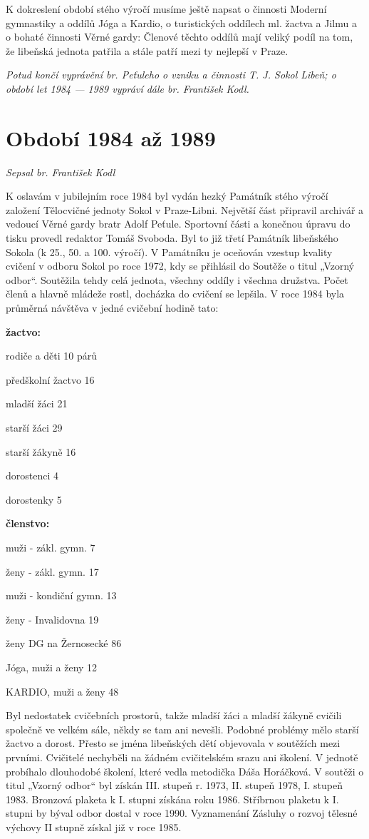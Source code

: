 K dokreslení období stého výročí musíme ještě napsat o činnosti Moderní
gymnastiky a oddílů Jóga a Kardio, o turistických oddílech ml. žactva a
Jilmu a o bohaté činnosti Věrné gardy: Členové těchto oddílů mají veliký
podíl na tom, že libeňská jednota patřila a stále patří mezi ty nejlepší
v Praze.

\emph{Potud končí vyprávění br. Peťuleho o vzniku a činnosti T. J. Sokol
Libeň; o období let 1984 --- 1989 vypráví dále br. František Kodl.}

\section{Období 1984 až 1989}\label{obdobuxed-1984-aux17e-1989}

\emph{Sepsal br. František Kodl}

K oslavám v jubilejním roce 1984 byl vydán hezký Památník stého výročí
založení Tělocvičné jednoty Sokol v Praze-Libni. Největší část připravil
archivář a vedoucí Věrné gardy bratr Adolf Peťule. Sportovní části a
konečnou úpravu do tisku provedl redaktor Tomáš Svoboda. Byl to již
třetí Památník libeňského Sokola (k 25., 50. a 100. výročí). V Památníku
je oceňován vzestup kvality cvičení v odboru Sokol po roce 1972, kdy se
přihlásil do Soutěže o titul „Vzorný odbor``. Soutěžila tehdy celá
jednota, všechny oddíly i všechna družstva. Počet členů a hlavně mládeže
rostl, docházka do cvičení se lepšila. V roce 1984 byla průměrná
návštěva v jedné cvičební hodině tato:

\textbf{žactvo:}

rodiče a děti 10 párů

předškolní žactvo 16

mladší žáci 21

starší žáci 29

starší žákyně 16

dorostenci 4

dorostenky 5

\textbf{členstvo:}

muži - zákl. gymn. 7

ženy - zákl. gymn. 17

muži - kondiční gymn. 13

ženy - Invalidovna 19

ženy DG na Žernosecké 86

Jóga, muži a ženy 12

KARDIO, muži a ženy 48

Byl nedostatek cvičebních prostorů, takže mladší žáci a mladší žákyně
cvičili společně ve velkém sále, někdy se tam ani nevešli. Podobné
problémy mělo starší žactvo a dorost. Přesto se jména libeňských dětí
objevovala v soutěžích mezi prvními. Cvičitelé nechyběli na žádném
cvičitelském srazu ani školení. V jednotě probíhalo dlouhodobé školení,
které vedla metodička Dáša Horáčková. V soutěži o titul „Vzorný odbor``
byl získán III. stupeň r. 1973, II. stupeň 1978, I. stupeň 1983.
Bronzová plaketa k I. stupni získána roku 1986. Stříbrnou plaketu k I.
stupni by býval odbor dostal v roce 1990. Vyznamenání Zásluhy o rozvoj
tělesné výchovy II stupně získal již v roce 1985.

